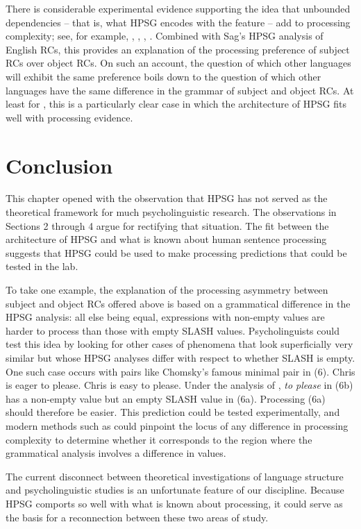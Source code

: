 \documentclass[a4paper]{article}
\begin{document}
There is considerable experimental evidence supporting the idea that unbounded dependencies -- that is, what HPSG encodes with the  feature -- add to processing complexity; see, for example, \citet{WannerMaratsos78}, \citet{KingJust91}, \citet{KluenderKutas93}, \citet{Hawkins99a}.  Combined with Sag's HPSG analysis of English RCs, this provides an explanation of the processing preference of subject RCs over object RCs.  On such an account, the question of which other languages will exhibit the same preference boils down to the question of which other languages have the same difference in the grammar of subject and object RCs.  At least for , this is a particularly clear case in which the architecture of HPSG fits well with processing evidence.

\section{Conclusion}

This chapter opened with the observation that HPSG has not served as the theoretical framework for much psycholinguistic research.  The observations in Sections 2 through 4 argue for rectifying that situation.  The fit between the architecture of HPSG and what is known about human sentence processing suggests that HPSG could be used to make processing predictions that could be tested in the lab.  

To take one example, the explanation of the processing asymmetry between subject and object RCs offered above is based on a grammatical difference in the HPSG analysis:  all else being equal, expressions with non-empty  values are harder to process than those with empty SLASH values.  Psycholinguists could test this idea by looking for other cases of phenomena that look superficially very similar but whose HPSG analyses differ with respect to whether SLASH is empty.  One such case occurs with pairs like  Chomsky's famous minimal pair in (6).
\eal
\ex Chris is eager to please.
\ex Chris is easy to please.
\zl
Under the analysis of \citet{ps2}, {\it to please} in (6b) has a non-empty  value but an empty SLASH value in (6a).  Processing (6a) should therefore be easier.  This prediction could be tested experimentally, and modern methods such as  could pinpoint the locus of any difference in processing complexity to determine whether it corresponds to the region where the grammatical analysis involves a difference in  values.

The current disconnect between theoretical investigations of language structure and psycholinguistic studies is an unfortunate feature of our discipline.  Because HPSG comports so well with what is known about processing, it could serve as the basis for a reconnection between these two areas of study.


{\sloppy
\printbibliography[heading=subbibliography,notkeyword=this] 
}
\end{document}
